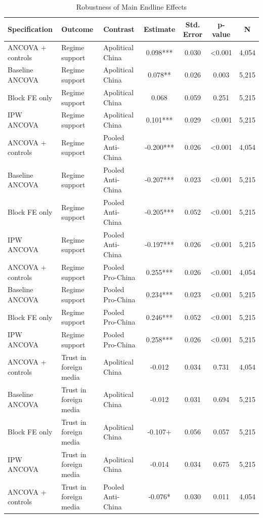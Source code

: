 \begin{table}[H]
\centering
\caption{Robustness of Main Endline Effects}
\label{tab:robustness_main_t1}
\footnotesize
\begin{threeparttable}
\begin{tabular}{lllcccc}
\toprule
Specification & Outcome & Contrast & Estimate & Std. Error & p-value & N \\
\midrule
ANCOVA + controls & Regime support & Apolitical China & 0.098*** & 0.030 & <0.001 & 4,054 \\
Baseline ANCOVA & Regime support & Apolitical China & 0.078** & 0.026 & 0.003 & 5,215 \\
Block FE only & Regime support & Apolitical China & 0.068 & 0.059 & 0.251 & 5,215 \\
IPW ANCOVA & Regime support & Apolitical China & 0.101*** & 0.029 & <0.001 & 5,215 \\
ANCOVA + controls & Regime support & Pooled Anti-China & -0.200*** & 0.026 & <0.001 & 4,054 \\
Baseline ANCOVA & Regime support & Pooled Anti-China & -0.207*** & 0.023 & <0.001 & 5,215 \\
Block FE only & Regime support & Pooled Anti-China & -0.205*** & 0.052 & <0.001 & 5,215 \\
IPW ANCOVA & Regime support & Pooled Anti-China & -0.197*** & 0.026 & <0.001 & 5,215 \\
ANCOVA + controls & Regime support & Pooled Pro-China & 0.255*** & 0.026 & <0.001 & 4,054 \\
Baseline ANCOVA & Regime support & Pooled Pro-China & 0.234*** & 0.023 & <0.001 & 5,215 \\
Block FE only & Regime support & Pooled Pro-China & 0.246*** & 0.052 & <0.001 & 5,215 \\
IPW ANCOVA & Regime support & Pooled Pro-China & 0.258*** & 0.026 & <0.001 & 5,215 \\
ANCOVA + controls & Trust in foreign media & Apolitical China & -0.012 & 0.034 & 0.731 & 4,054 \\
Baseline ANCOVA & Trust in foreign media & Apolitical China & -0.012 & 0.031 & 0.694 & 5,215 \\
Block FE only & Trust in foreign media & Apolitical China & -0.107+ & 0.056 & 0.057 & 5,215 \\
IPW ANCOVA & Trust in foreign media & Apolitical China & -0.014 & 0.034 & 0.675 & 5,215 \\
ANCOVA + controls & Trust in foreign media & Pooled Anti-China & -0.076* & 0.030 & 0.011 & 4,054 \\

\end{tabular}
\end{threeparttable}
\end{table}
